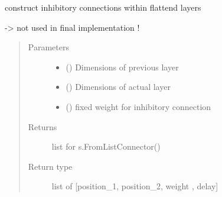 \documentclass[letterpaper,10pt,english]{sphinxmanual}
\begin{document}
\begin{fulllineitems}
\label{\detokenize{SpikingConvNet:SpikingConvNet.algorithms.rebuild_inhibitory_connections}}
construct inhibitory connections within flattend layers

-\textgreater{} not used in final implementation !
\begin{quote}\begin{description}
\item[{Parameters}] \leavevmode\begin{itemize}
\item {} 
 () \textendash{} Dimensions of previous layer

\item {} 
 () \textendash{} Dimensions of actual layer

\item {} 
 () \textendash{} fixed weight for inhibitory connection

\end{itemize}

\item[{Returns}] \leavevmode
{} \textendash{} list for s.FromListConnector()

\item[{Return type}] \leavevmode
list of {[}position\_1, position\_2, weight , delay{]}

\end{description}\end{quote}

\end{fulllineitems}

\end{document}
